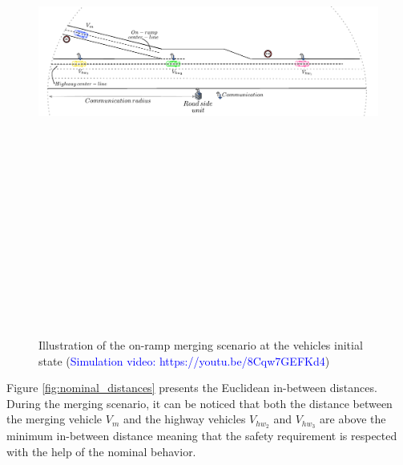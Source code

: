      \begin{figure}[!h]
        \centering 
        \includegraphics[width=13cm,height=18cm,keepaspectratio]{chapters/Chapitre_6/Nominal_Scene_simulation_scenario.pdf}
        \caption{Illustration of the on-ramp merging scenario at the vehicles initial state (\textcolor{blue}{Simulation video: https://youtu.be/8Cqw7GEFKd4})}
        \label{fig:illustration_nominal_simulation}
        \end{figure}

Figure \ref{fig:nominal_distances} presents the Euclidean in-between distances. During the merging scenario, it can be noticed that both the distance between the merging vehicle $V_m$ and the highway vehicles $V_{hw_2}$ and $V_{hw_3}$ are above the minimum in-between distance meaning that the safety requirement is respected with the help of the nominal behavior. 


